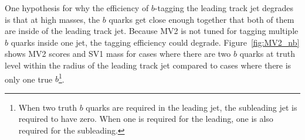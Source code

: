 One hypothesis for why the efficiency of $b$-tagging the leading track jet degrades is that at high masses, the $b$ quarks get close enough together that both of them are inside of the leading track jet. Because MV2 is not tuned for tagging multiple $b$ quarks inside one jet, the tagging efficiency could degrade. Figure~\ref{fig:MV2_nb} shows MV2 scores and SV1 mass for cases where there are two $b$ quarks at truth level within the radius of the leading track jet compared to cases where there is only one true $b$\footnote{When two truth $b$ quarks are required in the leading jet, the subleading jet is required to have zero. When one is required for the leading, one is also required for the subleading.}. 
%
\begin{figure}[t!]
  \centering
  \captionsetup{justification=centering}


\end{figure}
